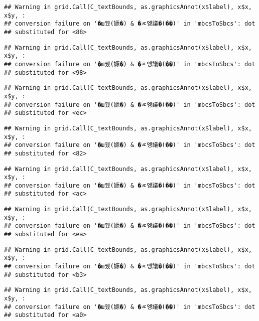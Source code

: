 \documentclass[
]{article}
\begin{document}
\begin{verbatim}
## Warning in grid.Call(C_textBounds, as.graphicsAnnot(x$label), x$x, x$y, :
## conversion failure on '�ш퀬(嫄�) & �ㅼ엥議�(��)' in 'mbcsToSbcs': dot
## substituted for <88>
\end{verbatim}

\begin{verbatim}
## Warning in grid.Call(C_textBounds, as.graphicsAnnot(x$label), x$x, x$y, :
## conversion failure on '�ш퀬(嫄�) & �ㅼ엥議�(��)' in 'mbcsToSbcs': dot
## substituted for <98>
\end{verbatim}

\begin{verbatim}
## Warning in grid.Call(C_textBounds, as.graphicsAnnot(x$label), x$x, x$y, :
## conversion failure on '�ш퀬(嫄�) & �ㅼ엥議�(��)' in 'mbcsToSbcs': dot
## substituted for <ec>
\end{verbatim}

\begin{verbatim}
## Warning in grid.Call(C_textBounds, as.graphicsAnnot(x$label), x$x, x$y, :
## conversion failure on '�ш퀬(嫄�) & �ㅼ엥議�(��)' in 'mbcsToSbcs': dot
## substituted for <82>
\end{verbatim}

\begin{verbatim}
## Warning in grid.Call(C_textBounds, as.graphicsAnnot(x$label), x$x, x$y, :
## conversion failure on '�ш퀬(嫄�) & �ㅼ엥議�(��)' in 'mbcsToSbcs': dot
## substituted for <ac>
\end{verbatim}

\begin{verbatim}
## Warning in grid.Call(C_textBounds, as.graphicsAnnot(x$label), x$x, x$y, :
## conversion failure on '�ш퀬(嫄�) & �ㅼ엥議�(��)' in 'mbcsToSbcs': dot
## substituted for <ea>
\end{verbatim}

\begin{verbatim}
## Warning in grid.Call(C_textBounds, as.graphicsAnnot(x$label), x$x, x$y, :
## conversion failure on '�ш퀬(嫄�) & �ㅼ엥議�(��)' in 'mbcsToSbcs': dot
## substituted for <b3>
\end{verbatim}

\begin{verbatim}
## Warning in grid.Call(C_textBounds, as.graphicsAnnot(x$label), x$x, x$y, :
## conversion failure on '�ш퀬(嫄�) & �ㅼ엥議�(��)' in 'mbcsToSbcs': dot
## substituted for <a0>
\end{verbatim}
\end{document}
